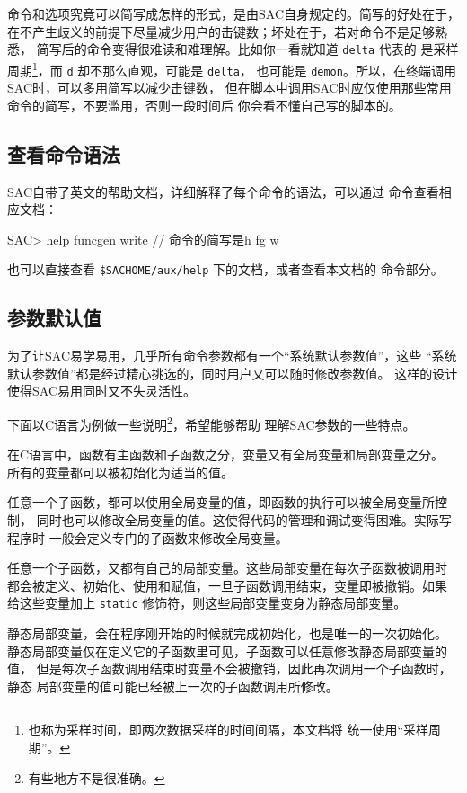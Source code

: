 命令和选项究竟可以简写成怎样的形式，是由SAC自身规定的。简写的好处在于，
在不产生歧义的前提下尽量减少用户的击键数；坏处在于，若对命令不是足够熟悉，
简写后的命令变得很难读和难理解。比如你一看就知道 \texttt{delta} 代表的
是采样周期\footnote{也称为采样时间，即两次数据采样的时间间隔，本文档将
统一使用``采样周期''。}，而 \texttt{d} 却不那么直观，可能是 \texttt{delta}，
也可能是 \texttt{demon}。所以，在终端调用SAC时，可以多用简写以减少击键数，
但在脚本中调用SAC时应仅使用那些常用命令的简写，不要滥用，否则一段时间后
你会看不懂自己写的脚本的。

\subsection{查看命令语法}
SAC自带了英文的帮助文档，详细解释了每个命令的语法，可以通过
 命令查看相应文档：
\begin{SACCode}
SAC> help funcgen write   // 命令的简写是h fg w
\end{SACCode}
也可以直接查看 \verb|$SACHOME/aux/help| 下的文档，或者查看本文档的
命令部分。

\subsection{参数默认值}
为了让SAC易学易用，几乎所有命令参数都有一个``系统默认参数值''，这些
``系统默认参数值''都是经过精心挑选的，同时用户又可以随时修改参数值。
这样的设计使得SAC易用同时又不失灵活性。

下面以C语言为例做一些说明\footnote{有些地方不是很准确。}，希望能够帮助
理解SAC参数的一些特点。

在C语言中，函数有主函数和子函数之分，变量又有全局变量和局部变量之分。
所有的变量都可以被初始化为适当的值。

任意一个子函数，都可以使用全局变量的值，即函数的执行可以被全局变量所控制，
同时也可以修改全局变量的值。这使得代码的管理和调试变得困难。实际写程序时
一般会定义专门的子函数来修改全局变量。

任意一个子函数，又都有自己的局部变量。这些局部变量在每次子函数被调用时
都会被定义、初始化、使用和赋值，一旦子函数调用结束，变量即被撤销。如果
给这些变量加上 \texttt{static} 修饰符，则这些局部变量变身为静态局部变量。

静态局部变量，会在程序刚开始的时候就完成初始化，也是唯一的一次初始化。
静态局部变量仅在定义它的子函数里可见，子函数可以任意修改静态局部变量的值，
但是每次子函数调用结束时变量不会被撤销，因此再次调用一个子函数时，静态
局部变量的值可能已经被上一次的子函数调用所修改。


